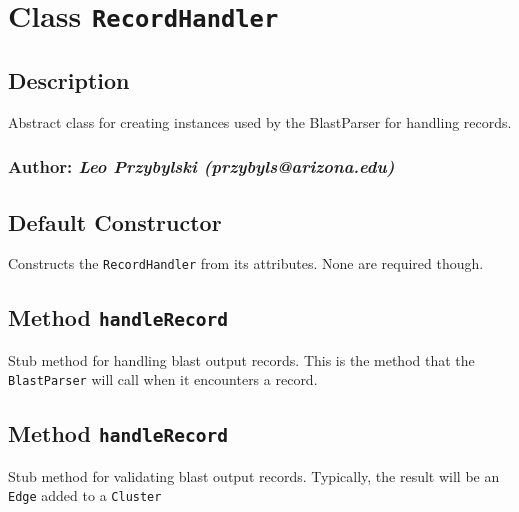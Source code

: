 
\section{Class \texttt{RecordHandler}\label{Class_RecordHandler}}
\subsection*{Description\label{Description}}


Abstract class for creating instances used by the BlastParser for handling
records.

\subsubsection*{Author: \textit{Leo Przybylski (przybyls@arizona.edu)}\label{Author:_Leo_Przybylski_przybyls_arizona_edu_}}
\subsection*{Default Constructor\label{Default_Constructor}}


Constructs the \texttt{RecordHandler} from its attributes. None are required though.

\subsection*{Method \texttt{handleRecord}\label{Method_handleRecord}}


Stub method for handling blast output records. This is the method that the 
\texttt{BlastParser} will call when it encounters a record.

\subsection*{Method \texttt{handleRecord}\label{Method_handleRecord}}


Stub method for validating blast output records. Typically, the result will
be an \texttt{Edge} added to a \texttt{Cluster}
